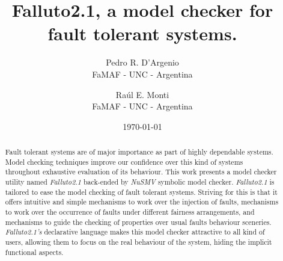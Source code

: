 \documentclass[12pt]{article}
\title{Falluto2.1, a model checker for fault tolerant systems.}
\author{ Pedro R. D'Argenio\\ FaMAF - UNC - Argentina \and Ra\'ul E. Monti\\
	 FaMAF - UNC - Argentina
}
\date{\today}
\begin{document}
\maketitle



\begin{abstract}
Fault tolerant systems are of major importance as part of highly dependable 
systems. Model checking techniques improve our confidence over this kind of
systems throughout exhaustive evaluation of its behaviour. This work presents
a model checker utility named \mbox{\textit{Falluto2.1}} back-ended by 
\mbox{\textit{NuSMV}} symbolic model checker. \mbox{\textit{Falluto2.1}} is
tailored to ease the model checking of fault tolerant systems. Striving for
this is that it offers intuitive and simple mechanisms to work over the 
injection of faults, mechanisms to work over the occurrence of faults under
different fairness arrangements, and mechanisms to guide the checking of 
properties over usual faults behaviour sceneries. \mbox{\textit{Falluto2.1's}}
declarative language makes this model checker attractive to all kind of users,
allowing them to focus on the real behaviour of the system, hiding the implicit
functional aspects.
\end{abstract}


\end{document}
